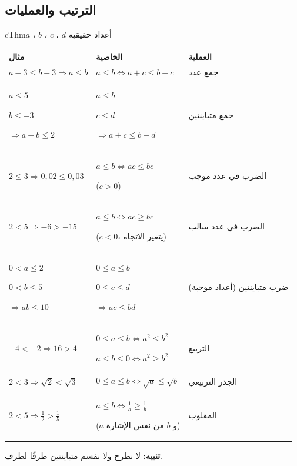 \documentclass[12pt,a4paper]{article}
\newenvironment{BOX}[2]{\begin{otherlanguage}{english}\begin{arbox}{#1}{#2}}{\end{arbox}\end{otherlanguage}}
\newenvironment{khassia}[1][خاصية]{\begin{BOX}{cThm}{#1}}{\end{BOX}}
\begin{document}
\subsection{الترتيب والعمليات}
\begin{khassia}[$a$ ، $b$ ، $c$ ، $d$ أعداد حقيقية]
\begin{center}
\renewcommand{\arraystretch}{1.45}
\begin{tabular}{|>{\centering\arraybackslash}p{}|>{\centering\arraybackslash}p{}|>{\centering\arraybackslash}p{}|}\hline
\rowcolor{cSec!12}\textbf{مثال} & \textbf{الخاصية} & \textbf{العملية}\\\hline
$a-3\leqslant b-3\Rightarrow a\leqslant b$ & $a\leqslant b\iff a+c\leqslant b+c$ & جمع عدد\\\hline
$a\leqslant5$ \par $b\leqslant-3$ \par $\Rightarrow a+b\leqslant2$ & $a\leqslant b$ \par $c\leqslant d$ \par $\Rightarrow a+c\leqslant b+d$ & جمع متباينتين\\\hline
$2\leqslant3\Rightarrow0{,}02\leqslant0{,}03$ & $a\leqslant b\iff ac\leqslant bc$ \par ($c>0$) & الضرب في عدد موجب\\\hline
$2<5\Rightarrow-6>-15$ & $a\leqslant b\iff ac\geqslant bc$ \par ($c<0$، يتغير الاتجاه) & الضرب في عدد سالب\\\hline
$0<a\leqslant2$ \par $0<b\leqslant5$ \par $\Rightarrow ab\leqslant10$ & $0\leqslant a\leqslant b$ \par $0\leqslant c\leqslant d$ \par $\Rightarrow ac\leqslant bd$ & ضرب متباينتين (أعداد موجبة)\\\hline
$-4<-2\Rightarrow16>4$ & $0\leqslant a\leqslant b\iff a^{2}\leqslant b^{2}$ \par $a\leqslant b\leqslant0\iff a^{2}\geqslant b^{2}$ & التربيع\\\hline
$2<3\Rightarrow\sqrt{2}<\sqrt{3}$ & $0\leqslant a\leqslant b\iff\sqrt{a}\leqslant\sqrt{b}$ & الجذر التربيعي\\\hline
$2<5\Rightarrow\frac{1}{2}>\frac{1}{5}$ & $a\leqslant b\iff\frac{1}{a}\geqslant\frac{1}{b}$ \par ($a$ و $b$ من نفس الإشارة) & المقلوب\\\hline
\end{tabular}
\end{center}
\textbf{تنبيه:} لا نطرح ولا نقسم متباينتين طرفًا لطرف.
\end{khassia}
\end{document}

